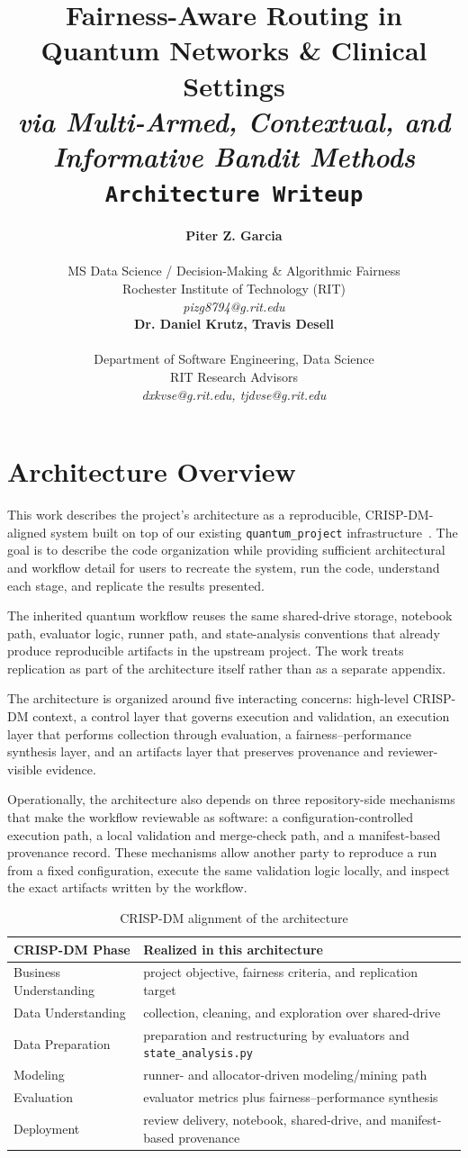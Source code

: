 \documentclass{IEEEtran}
\title{{\LARGE\textbf{Fairness-Aware Routing in Quantum Networks \& Clinical Settings}}\\
{\Large\textit{via Multi-Armed, Contextual, and Informative Bandit Methods}}\\
{\large\texttt{Architecture Writeup}}}
\author{%
\begin{minipage}{0.48\textwidth}
\begin{center}
{\bf Piter Z. Garcia}\\
\begin{small}
MS Data Science / Decision-Making \& Algorithmic Fairness\\
Rochester Institute of Technology (RIT)\\
{\it pizg8794@g.rit.edu}
\end{small}
\end{center}
\end{minipage}
\hfill
\begin{minipage}{0.48\textwidth}
\begin{center}
{\bf Dr. Daniel Krutz, Travis Desell}\\
\begin{small}
Department of Software Engineering, Data Science\\
RIT Research Advisors\\
{\it dxkvse@g.rit.edu, tjdvse@g.rit.edu}
\end{small}
\end{center}
\end{minipage}%
}
\begin{document}
\maketitle

\section{Architecture Overview}

This work describes the project's architecture as a reproducible, CRISP-DM-aligned system built on top of our existing \texttt{quantum\_project} infrastructure~\cite{quantumhub}. The goal is to describe the code organization while providing sufficient architectural and workflow detail for users to recreate the system, run the code, understand each stage, and replicate the results presented.

The inherited quantum workflow reuses the same shared-drive storage, notebook path, evaluator logic, runner path, and state-analysis conventions that already produce reproducible artifacts in the upstream project. The work treats replication as part of the architecture itself rather than as a separate appendix.

The architecture is organized around five interacting concerns: high-level CRISP-DM context, a control layer that governs execution and validation, an execution layer that performs collection through evaluation, a fairness--performance synthesis layer, and an artifacts layer that preserves provenance and reviewer-visible evidence.

Operationally, the architecture also depends on three repository-side mechanisms that make the workflow reviewable as software: a configuration-controlled execution path, a local validation and merge-check path, and a manifest-based provenance record. These mechanisms allow another party to reproduce a run from a fixed configuration, execute the same validation logic locally, and inspect the exact artifacts
written by the workflow.

\begin{table}[ht!]
\centering
\caption{CRISP-DM alignment of the architecture}
\label{tab:crisp_alignment}
\small
\begin{tabular}{p{2.2cm}p{4.8cm}}
\toprule
\textbf{CRISP-DM Phase} & \textbf{Realized in this architecture} \\
\midrule
Business Understanding & project objective, fairness criteria, and replication target \\
Data Understanding & collection, cleaning, and exploration over shared-drive \\
Data Preparation & preparation and restructuring by evaluators and \texttt{state\_analysis.py} \\
Modeling & runner- and allocator-driven modeling/mining path \\
Evaluation & evaluator metrics plus fairness--performance synthesis \\
Deployment & review delivery, notebook, shared-drive, and manifest-based provenance \\
\bottomrule
\end{tabular}
\end{table}
\end{document}
